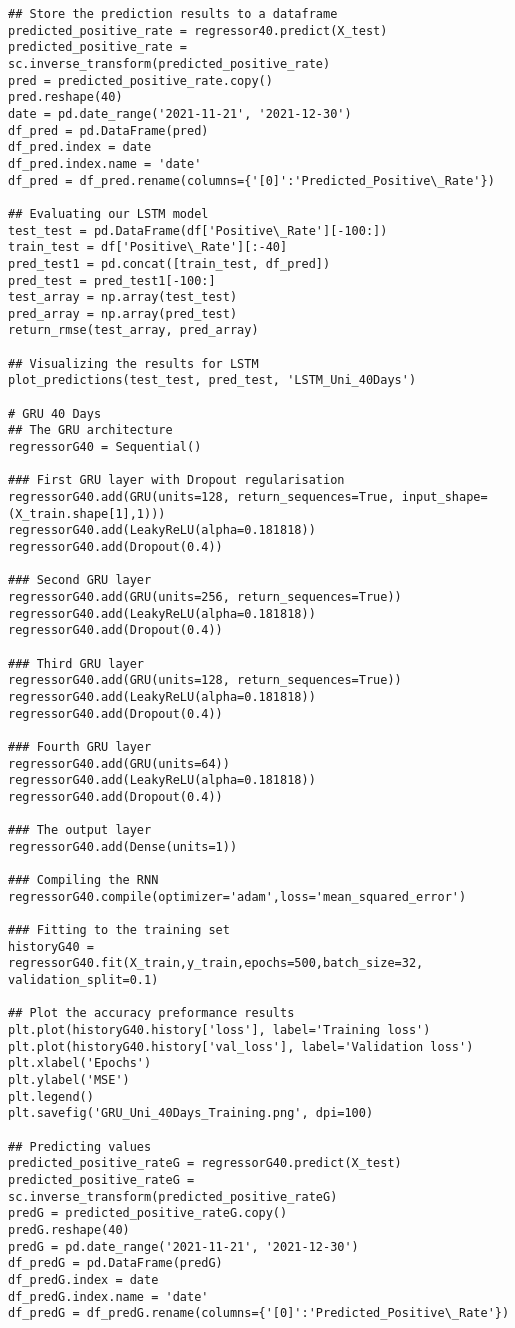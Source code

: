 \begin{appendices}
\begin{verbatim}
## Store the prediction results to a dataframe
predicted_positive_rate = regressor40.predict(X_test)
predicted_positive_rate = sc.inverse_transform(predicted_positive_rate)
pred = predicted_positive_rate.copy()
pred.reshape(40)
date = pd.date_range('2021-11-21', '2021-12-30')
df_pred = pd.DataFrame(pred)
df_pred.index = date
df_pred.index.name = 'date'
df_pred = df_pred.rename(columns={'[0]':'Predicted_Positive\_Rate'})

## Evaluating our LSTM model
test_test = pd.DataFrame(df['Positive\_Rate'][-100:])
train_test = df['Positive\_Rate'][:-40]
pred_test1 = pd.concat([train_test, df_pred])
pred_test = pred_test1[-100:]
test_array = np.array(test_test)
pred_array = np.array(pred_test)
return_rmse(test_array, pred_array)

## Visualizing the results for LSTM
plot_predictions(test_test, pred_test, 'LSTM_Uni_40Days')

# GRU 40 Days
## The GRU architecture
regressorG40 = Sequential()

### First GRU layer with Dropout regularisation
regressorG40.add(GRU(units=128, return_sequences=True, input_shape=(X_train.shape[1],1)))
regressorG40.add(LeakyReLU(alpha=0.181818))
regressorG40.add(Dropout(0.4))

### Second GRU layer
regressorG40.add(GRU(units=256, return_sequences=True))
regressorG40.add(LeakyReLU(alpha=0.181818))
regressorG40.add(Dropout(0.4))

### Third GRU layer
regressorG40.add(GRU(units=128, return_sequences=True))
regressorG40.add(LeakyReLU(alpha=0.181818))
regressorG40.add(Dropout(0.4))

### Fourth GRU layer
regressorG40.add(GRU(units=64))
regressorG40.add(LeakyReLU(alpha=0.181818))
regressorG40.add(Dropout(0.4))

### The output layer
regressorG40.add(Dense(units=1))

### Compiling the RNN
regressorG40.compile(optimizer='adam',loss='mean_squared_error')

### Fitting to the training set
historyG40 = regressorG40.fit(X_train,y_train,epochs=500,batch_size=32, validation_split=0.1)

## Plot the accuracy preformance results
plt.plot(historyG40.history['loss'], label='Training loss')
plt.plot(historyG40.history['val_loss'], label='Validation loss')
plt.xlabel('Epochs')
plt.ylabel('MSE')
plt.legend()
plt.savefig('GRU_Uni_40Days_Training.png', dpi=100)

## Predicting values
predicted_positive_rateG = regressorG40.predict(X_test)
predicted_positive_rateG = sc.inverse_transform(predicted_positive_rateG)
predG = predicted_positive_rateG.copy()
predG.reshape(40)
predG = pd.date_range('2021-11-21', '2021-12-30')
df_predG = pd.DataFrame(predG)
df_predG.index = date
df_predG.index.name = 'date'
df_predG = df_predG.rename(columns={'[0]':'Predicted_Positive\_Rate'})


\end{verbatim}
\end{appendices}
